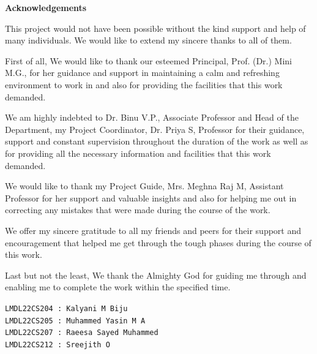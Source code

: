 \documentclass[11pt]{report}
\begin{document}
\begin{titlepage}
\vspace{.25in}	
\begin{center}
\textbf{Acknowledgements}\\
\end{center}
\normalsize

This project would not have been possible without the kind support and help of many individuals. We would like to extend my sincere thanks to all of them.
  
First of all, We would like to thank our esteemed Principal, Prof. (Dr.) Mini M.G., for her guidance and support in maintaining a calm and refreshing environment to work in and also for providing the facilities that this work demanded.
  
We am highly indebted to Dr. Binu V.P., Associate Professor and Head of the Department, my Project Coordinator, Dr. Priya S, Professor for their guidance, support and constant supervision throughout the duration of the work as well as for providing all the necessary information and facilities that this work demanded.

We would like to thank my Project Guide, Mrs. Meghna Raj M, Assistant Professor for her support and valuable insights and also for helping me out in correcting any mistakes that were made during the course of the work. 
  
We offer my sincere gratitude to all my friends and peers for their support and encouragement that helped me get through the tough phases during the course of this work.
  
Last but not the least, We thank the Almighty God for guiding me through and enabling me to complete the work within the specified time.
\vspace{.25in}

\vspace{.25in}


\flushleft \small{\texttt{LMDL22CS204 : Kalyani M Biju }} \\
\vspace{-0.4cm}
\flushleft \small{\texttt{LMDL22CS205 : Muhammed Yasin M A }} \\
\vspace{-0.4cm}
\flushleft \small{\texttt{LMDL22CS207 : Raeesa Sayed Muhammed }} \\
\vspace{-0.4cm}
\flushleft \small{\texttt{LMDL22CS212 : Sreejith O }} \\
\end{titlepage}
\end{document}
